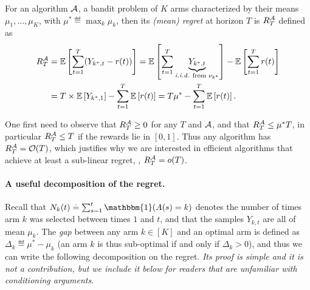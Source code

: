 \begin{definition}[Regret]\label{def:2:regret}
\begin{leftbar}[defnbar]  %
    For an algorithm $\mathcal{A}$, a bandit problem of $K$ arms characterized by their means $\mu_1,\dots,\mu_K$, with $\mu^* \eqdef \max_k \mu_k$, then its \emph{(mean) regret} at horizon $T$ is $R_T^{\mathcal{A}}$ defined as
    \begin{align}\label{eq:2:regret}
        R_T^{\mathcal{A}}
        & = \mathbb{E}\left[ \sum_{t=1}^T (Y_{k^*,t} - r(t)) \right]
        = \mathbb{E}\left[ \sum_{t=1}^T \underbrace{Y_{k^*,t}}_{\text{\emph{i.i.d.}{} from $\nu_{k^*}$}} \right] - \mathbb{E}\left[ \sum_{t=1}^T r(t) \right] \\
        & = T \times \mathbb{E}\left[ Y_{k^*,1} \right] - \sum_{t=1}^T \mathbb{E}\left[ r(t) \right]
        = T \mu^* - \sum_{t=1}^T \mathbb{E}\left[ r(t) \right].
    \end{align}
\end{leftbar}  %
\end{definition}

One first need to observe that $R_T^{\mathcal{A}} \geq 0$ for any $T$ and $\mathcal{A}$, and that $R_T^{\mathcal{A}} \leq \mu^* T$, in particular $R_T^{\mathcal{A}} \leq T$ if the rewards lie in $[0,1]$.
Thus any algorithm has $R_T^{\mathcal{A}} = \mathop{}\mathopen{}\mathcal{O}\mathopen{}\left(T\right)$, which justifies why we are interested in efficient algorithms that achieve at least a sub-linear regret, \ie, $R_T^{\mathcal{A}} = \mathop{}\mathopen{}o\mathopen{}\left(T\right)$.

\paragraph{A useful decomposition of the regret.}
%
Recall that $N_k(t) \eqdef \sum_{s=1}^t \mathbbm{1}(A(s) = k)$ denotes the number of times arm $k$ was selected between times $1$ and $t$,
%
and that the samples $Y_{k,t}$ are all \iid{} of mean $\mu_k$.
The \emph{gap} between any arm $k\in[K]$ and an optimal arm is defined as $\Delta_k \eqdef \mu^* - \mu_k$
(an arm $k$ is thus sub-optimal if and only if $\Delta_k > 0$),
and thus we can write the following decomposition on the regret.
%
\emph{Its proof is simple and it is not a contribution, but we include it below for readers that are unfamiliar with conditioning arguments}.

